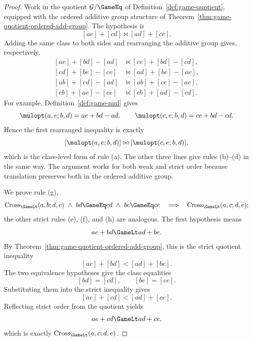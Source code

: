 \begin{proof}
  \leanok
  Work in the quotient \(\mathcal G/{\GameEq}\) of
  Definition~\ref{def:game-quotient}, equipped with the ordered additive group structure of
  Theorem~\ref{thm:game-quotient-ordered-add-group}.  The hypothesis is
  \[
    [ae]+[cd]\mathrel{\bowtie}[ad]+[ce].
  \]
  Adding the same class to both sides and rearranging the additive group gives,
  respectively,
  \[
    \begin{aligned}
      {}[ae]+[bd]-[ad]&\mathrel{\bowtie}[ce]+[bd]-[cd],\\
      {}[cd]+[be]-[ce]&\mathrel{\bowtie}[ad]+[be]-[ae],\\
      {}[ab]+[cd]-[ad]&\mathrel{\bowtie}[ab]+[ce]-[ae],\\
      {}[cb]+[ae]-[ce]&\mathrel{\bowtie}[cb]+[ad]-[cd].
    \end{aligned}
  \]
  For example, Definition~\ref{def:game-mul} gives
  \[
    \mulopt(a,e;b,d)=ae+bd-ad,
    \qquad
    \mulopt(c,e;b,d)=ce+bd-cd.
  \]
  Hence the first rearranged inequality is exactly
  \[
    [\mulopt(a,e;b,d)]\mathrel{\bowtie}[\mulopt(c,e;b,d)],
  \]
  which is the class-level form of rule \textup{(a)}.
  The other three lines give rules \textup{(b)}--\textup{(d)} in the same way.
  The argument works for both weak and strict order because translation preserves both in
  the ordered additive group.

  We prove rule \textup{(g)},
  \[
    \operatorname{Cross}_{\GameLt}(a,b;d,e)
      \ \wedge\ bd\GameEq cd
      \ \wedge\ be\GameEq ce
      \quad\Longrightarrow\quad
    \operatorname{Cross}_{\GameLt}(a,c;d,e);
  \]
  the other strict rules \textup{(e)}, \textup{(f)}, and \textup{(h)} are analogous.
  The first hypothesis means
  \[
    ae+bd\GameLt ad+be.
  \]
  By Theorem~\ref{thm:game-quotient-ordered-add-group}, this is the strict
  quotient inequality
  \[
    [ae]+[bd]<[ad]+[be].
  \]
  The two equivalence hypotheses give the class equalities
  \[
    [bd]=[cd],
    \qquad
    [be]=[ce].
  \]
  Substituting them into the strict inequality gives
  \[
    [ae]+[cd]<[ad]+[ce].
  \]
  Reflecting strict order from the quotient yields
  \[
    ae+cd\GameLt ad+ce,
  \]
  which is exactly
  \(\operatorname{Cross}_{\GameLt}(a,c;d,e)\).
\end{proof}

